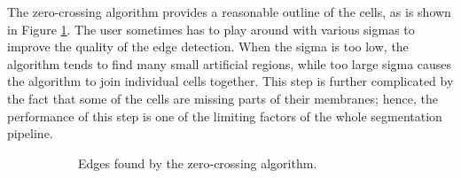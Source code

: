 \documentclass[
  digital,     %
  oneside,     %
  nosansbold,  %
  nocolorbold, %
  lof,         %
  lot,         %
]{fithesis4}
\begin{document}
The zero-crossing algorithm provides a reasonable outline of the cells, as is
shown in Figure \ref{fig:zc}. The user sometimes has to play around with
various sigmas to improve the quality of the edge detection. When the sigma is
too low, the algorithm tends to find many small artificial regions, while too
large sigma causes the algorithm to join individual cells together. This step
is further complicated by the fact that some of the cells are missing parts of
their membranes; hence, the performance of this step is one of the limiting factors of
the whole segmentation pipeline.

\begin{figure}
    \begin{subfigure}[t]{0.45\textwidth}
        \caption{Edges found by the zero-crossing algorithm.}
        \label{fig:zc}
    \end{subfigure}
    \begin{subfigure}[t]{0.45\textwidth}

\end{subfigure}
\end{figure}
\end{document}

